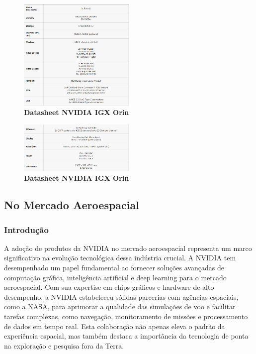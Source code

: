 \documentclass[conference]{IEEEtran}
\begin{document}
\begin{figure}[h]
\centerline{\includegraphics[width = 2.2in]{Screenshot 2023-08-20 000929.png}}
\caption{\textbf{Datasheet NVIDIA IGX Orin}}
\label{figAM9300}
\end{figure}



\begin{figure}[h]
\centerline{\includegraphics[width = 2.2in]{Screenshot 2023-08-20 000941.png}}
\caption{\textbf{Datasheet NVIDIA IGX Orin}}
\label{figAM9300}
\end{figure}


\subsection{No Mercado Aeroespacial}
\subsubsection{Introdução}

\par A adoção de produtos da NVIDIA no mercado aeroespacial representa um marco significativo na evolução tecnológica dessa indústria crucial. A NVIDIA tem desempenhado um papel fundamental ao fornecer soluções avançadas de computação gráfica, inteligência artificial e deep learning para o mercado aeroespacial. Com sua expertise em chips gráficos e hardware de alto desempenho, a NVIDIA estabeleceu sólidas parcerias com agências espaciais, como a NASA, para aprimorar a qualidade das simulações de voo e facilitar tarefas complexas, como navegação, monitoramento de missões e processamento de dados em tempo real. Esta colaboração não apenas eleva o padrão da experiência espacial, mas também destaca a importância da tecnologia de ponta na exploração e pesquisa fora da Terra.
\end{document}
